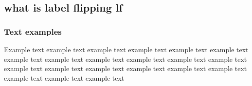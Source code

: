 \subsection{what is label flipping lf}


\subsubsection{Text examples}
Example text example text example text example text example text example text example text
example text example text example text example text example text example text example text
example text example text example text example text example text example text example text


\pagebreak